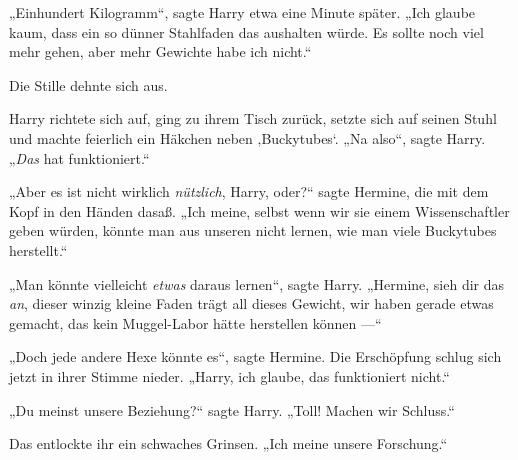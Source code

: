 „Einhundert Kilogramm“, sagte Harry etwa eine Minute später.
„Ich glaube kaum, dass ein so dünner Stahlfaden das aushalten würde. Es sollte noch viel mehr gehen, aber mehr Gewichte habe ich nicht.“

Die Stille dehnte sich aus.

Harry richtete sich auf, ging zu ihrem Tisch zurück, setzte sich auf seinen Stuhl und machte feierlich ein Häkchen neben ‚Buckytubes‘.
„Na also“, sagte Harry.
„\emph{Das} hat funktioniert.“

„Aber es ist nicht wirklich \emph{nützlich}, Harry, oder?“ sagte Hermine, die mit dem Kopf in den Händen dasaß.
„Ich meine, selbst wenn wir sie einem Wissenschaftler geben würden, könnte man aus unseren nicht lernen, wie man viele Buckytubes herstellt.“

„Man könnte vielleicht \emph{etwas} daraus lernen“, sagte Harry.
„Hermine, sieh dir das \emph{an}, dieser winzig kleine Faden trägt all dieses Gewicht, wir haben gerade etwas gemacht, das kein Muggel-Labor hätte herstellen können —“

„Doch jede andere Hexe könnte es“, sagte Hermine. Die Erschöpfung schlug sich jetzt in ihrer Stimme nieder.
„Harry, ich glaube, das funktioniert nicht.“

„Du meinst unsere Beziehung?“ sagte Harry.
„Toll! Machen wir Schluss.“

Das entlockte ihr ein schwaches Grinsen.
„Ich meine unsere Forschung.“

